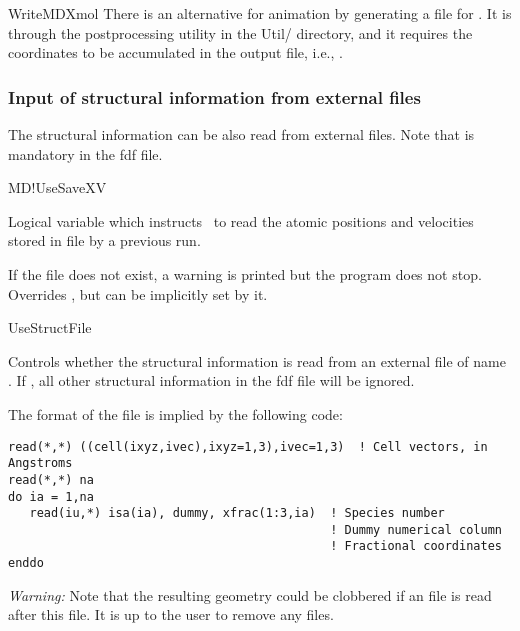 \begin{itemize}
\begin{fdflogicalF}{WriteMDXmol}
    There is an alternative for animation by generating a  file for
    . It is through the
     postprocessing
    utility in the Util/ directory, and it 
    requires the coordinates to be accumulated in the output file, i.e.,
     \fdftrue.

  \end{fdflogicalF}

\end{itemize}



\subsubsection{Input of structural information from external files}

The structural information can be also read from external files. Note
that  is mandatory in the fdf file.

\begin{fdflogicalF}{MD!UseSaveXV}

  Logical variable which instructs \siesta\ to read the atomic
  positions and velocities stored in file  by a previous
  run.
  
  If the file does not exist, a warning is printed but the
  program does not stop. Overrides , but can be
  implicitly set by it.

\end{fdflogicalF}

\begin{fdflogicalF}{UseStructFile}

  Controls whether the structural information is read from an external
  file of name . If \fdftrue, all other
  structural information in the fdf file will be ignored.

  The format of the file is implied by the following code:
\begin{verbatim}
read(*,*) ((cell(ixyz,ivec),ixyz=1,3),ivec=1,3)  ! Cell vectors, in Angstroms
read(*,*) na
do ia = 1,na
   read(iu,*) isa(ia), dummy, xfrac(1:3,ia)  ! Species number
                                             ! Dummy numerical column
                                             ! Fractional coordinates
enddo
\end{verbatim}
  
  \textit{Warning:} Note that the resulting geometry could be clobbered if
  an  file is read after this file. It is up to the user to remove
  any  files.
  
\end{fdflogicalF}


